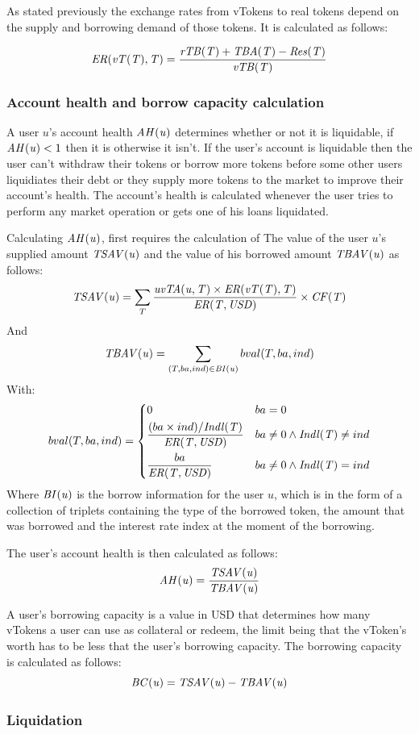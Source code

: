 As stated previously the exchange rates from vTokens to real tokens depend on the supply and borrowing demand of those tokens. It is calculated as follows:

$$
  \mathit{ER(\mathit{vT(T)}, T)} = \frac{\mathit{rTB(T)} + \mathit{TBA(T)} - \mathit{Res(T)}}{\mathit{vTB(T)}}
$$

\subsubsection{Account health and borrow capacity calculation}

A user $u$'s account health $\mathit{AH(u)}$ determines whether or not it is liquidable, if $\mathit{AH(u)} < 1$ then it is otherwise it isn't. If the user's account is liquidable then the user can't withdraw their tokens or borrow more tokens before some other users liquidiates their debt or they supply more tokens to the market to improve their account's health. The account's health is calculated whenever the user tries to perform any market operation or gets one of his loans liquidated.

Calculating $\mathit{AH(u)}$, first requires the calculation of The value of the user $u$'s supplied amount $\mathit{TSAV(u)}$ and the value of his borrowed amount $\mathit{TBAV(u)}$ as follows:
$$
  \mathit{TSAV(u)} = \sum_{T} \frac{\mathit{uvTA(u, T)} \times \mathit{ER(\mathit{vT(T)}, T)}}{\mathit{ER(T, \mathit{USD})}} \times \mathit{CF(T)}
$$
And
$$
  \mathit{TBAV(u)} = \sum_{(T, ba, ind) \in \mathit{BI(u)}} bval(T, ba, ind)
$$
With: 
$$
bval(T, ba, ind) = 
\begin{dcases}
  0 & ba = 0\\
  \frac{(ba \times ind)/ \mathit{Indl(T)}}{\mathit{ER(T, \mathit{USD})}} & ba \neq 0 \wedge \mathit{Indl(T)} \neq ind \\
  \frac{ba}{\mathit{ER(T, \mathit{USD})}} & ba \neq 0 \wedge \mathit{Indl(T)} = ind
\end{dcases}
$$
Where $\mathit{BI(u)}$ is the borrow information for the user $u$, which is in the form of a collection of triplets containing the type of the borrowed token, the amount that was borrowed and the interest rate index at the moment of the borrowing. 

The user's account health is then calculated as follows:
$$
  \mathit{AH(u)} = \frac{\mathit{TSAV(u)}}{\mathit{TBAV(u)}}
$$


A user's borrowing capacity is a value in USD that determines how many vTokens a user can use as collateral or redeem, the limit being that the vToken's worth has to be less that the user's borrowing capacity. The borrowing capacity is calculated as follows:
$$
  \mathit{BC(u)} = \mathit{TSAV(u)} - \mathit{TBAV(u)}
$$

\subsubsection{Liquidation}

